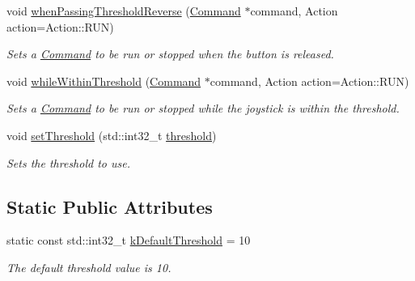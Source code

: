 \begin{DoxyCompactItemize}
void \mbox{\hyperlink{classlib_iterative_robot_1_1_joystick_channel_a6b90ec0fdbca27aee324ff9d71e93a94}{when\+Passing\+Threshold\+Reverse}} (\mbox{\hyperlink{classlib_iterative_robot_1_1_command}{Command}} $\ast$command, Action action=Action\+::\+R\+UN)
\begin{DoxyCompactList}\small\item\em Sets a \mbox{\hyperlink{classlib_iterative_robot_1_1_command}{Command}} to be run or stopped when the button is released. \end{DoxyCompactList}\item 
void \mbox{\hyperlink{classlib_iterative_robot_1_1_joystick_channel_ac69e7ff6ba69d85a614d6e847a0aae5d}{while\+Within\+Threshold}} (\mbox{\hyperlink{classlib_iterative_robot_1_1_command}{Command}} $\ast$command, Action action=Action\+::\+R\+UN)
\begin{DoxyCompactList}\small\item\em Sets a \mbox{\hyperlink{classlib_iterative_robot_1_1_command}{Command}} to be run or stopped while the joystick is within the threshold. \end{DoxyCompactList}\item 
void \mbox{\hyperlink{classlib_iterative_robot_1_1_joystick_channel_a5177f15ef0ffef2e47b14633163d438f}{set\+Threshold}} (std\+::int32\+\_\+t \mbox{\hyperlink{classlib_iterative_robot_1_1_joystick_channel_acc3695cfa13f8c1fca612d7d0803916e}{threshold}})
\begin{DoxyCompactList}\small\item\em Sets the threshold to use. \end{DoxyCompactList}\end{DoxyCompactItemize}
\subsection*{Static Public Attributes}
\begin{DoxyCompactItemize}
\item 
\mbox{\label{classlib_iterative_robot_1_1_joystick_channel_a29c1fe2a3e5d09fc47d9d7fc4f7b5288}} 
static const std\+::int32\+\_\+t \mbox{\hyperlink{classlib_iterative_robot_1_1_joystick_channel_a29c1fe2a3e5d09fc47d9d7fc4f7b5288}{k\+Default\+Threshold}} = 10
\begin{DoxyCompactList}\small\item\em The default threshold value is 10. \end{DoxyCompactList}\end{DoxyCompactItemize}
